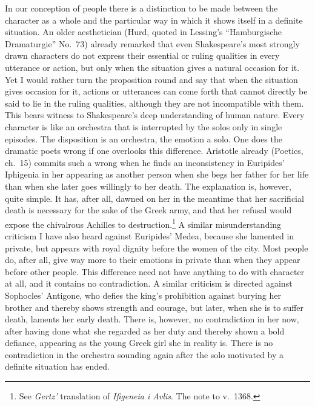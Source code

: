\documentclass[12pt]{book}
\newcommand{\opage}[1]{\marginnote{\footnotesize\textit{[#1]}}}
\begin{document}
In our conception of people there is a distinction to be made between the character as a
whole and the particular way in which it shows itself in a definite situation. An older
aesthetician (Hurd, quoted in Lessing's ``Hamburgische Dramaturgie'' No.~73) already
remarked that even Shakespeare's most strongly drawn characters do not express their
essential or ruling qualities in every utterance or action, but only when the situation
gives a natural occasion for it. Yet I would rather turn the proposition round and say that
when the situation gives occasion for it, actions or utterances can come forth that cannot
directly be said to lie in the ruling qualities, although they are not incompatible with
them. This bears witness to Shakespeare's deep understanding of human nature. Every
character is like an orchestra that is interrupted by the solos only in single episodes.
The disposition is an orchestra, the emotion a solo. One does the dramatic poets wrong if
one overlooks this difference. Aristotle already (Poetics, ch.~15) commits such a wrong when
he finds an inconsistency in Euripides' Iphigenia in her appearing as another person when
she begs her father for her life than when she later goes willingly to her death. The
explanation is, however, quite simple. It has, after all, dawned on her in the meantime
that her sacrificial death is necessary for the sake of the Greek army, and that her refusal
would expose the chivalrous Achilles to destruction.\footnote{See \textit{Gertz'}
translation of \textit{Ifigeneia i Avlis}. The note to v.~1368.} A similar misunderstanding
criticism I have also heard against Euripides' Medea, because she lamented in private, but
appears with royal dignity before the women of the city. Most people do, after all, give way
more to their emotions in private than when they appear before other people. This
difference need not have anything to do with character at all, and it contains no
contradiction. A similar criticism is directed against Sophocles' Antigone, who defies the
king's prohibition against \opage{130}burying her brother and thereby shows strength and
courage, but later, when she is to suffer death, laments her early death. There is,
however, no contradiction in her now, after having done what she regarded as her duty and
thereby shown a bold defiance, appearing as the young Greek girl she in reality is. There is
no contradiction in the orchestra sounding again after the solo motivated by a definite
situation has ended.
\end{document}
